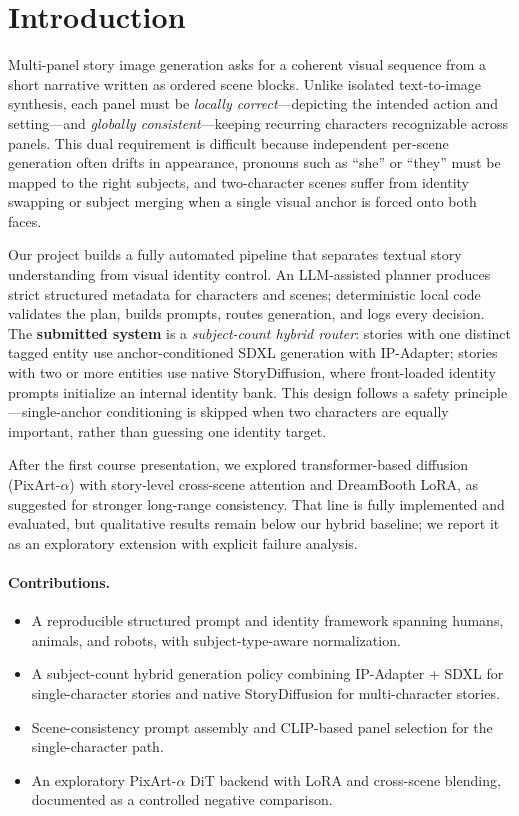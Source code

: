 \section{Introduction}
\label{sec:intro}

Multi-panel story image generation asks for a coherent visual sequence from a short narrative written as ordered scene blocks.
Unlike isolated text-to-image synthesis, each panel must be \emph{locally correct}---depicting the intended action and setting---and \emph{globally consistent}---keeping recurring characters recognizable across panels.
This dual requirement is difficult because independent per-scene generation often drifts in appearance, pronouns such as ``she'' or ``they'' must be mapped to the right subjects, and two-character scenes suffer from identity swapping or subject merging when a single visual anchor is forced onto both faces.

Our project builds a fully automated pipeline that separates textual story understanding from visual identity control.
An LLM-assisted planner produces strict structured metadata for characters and scenes; deterministic local code validates the plan, builds prompts, routes generation, and logs every decision.
The \textbf{submitted system} is a \emph{subject-count hybrid router}: stories with one distinct tagged entity use anchor-conditioned SDXL generation with IP-Adapter; stories with two or more entities use native StoryDiffusion, where front-loaded identity prompts initialize an internal identity bank.
This design follows a safety principle---single-anchor conditioning is skipped when two characters are equally important, rather than guessing one identity target.

After the first course presentation, we explored transformer-based diffusion (PixArt-$\alpha$) with story-level cross-scene attention and DreamBooth LoRA, as suggested for stronger long-range consistency.
That line is fully implemented and evaluated, but qualitative results remain below our hybrid baseline; we report it as an exploratory extension with explicit failure analysis.

\paragraph{Contributions.}
\begin{itemize}
  \item A reproducible structured prompt and identity framework spanning humans, animals, and robots, with subject-type-aware normalization.
  \item A subject-count hybrid generation policy combining IP-Adapter + SDXL for single-character stories and native StoryDiffusion for multi-character stories.
  \item Scene-consistency prompt assembly and CLIP-based panel selection for the single-character path.
  \item An exploratory PixArt-$\alpha$ DiT backend with LoRA and cross-scene blending, documented as a controlled negative comparison.
\end{itemize}

